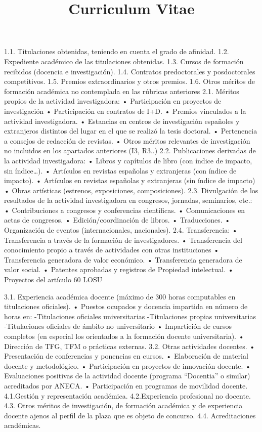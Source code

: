 \documentclass[a4paper,skipsamekey,11pt,english]{curve}
\title{Curriculum Vitae}
\begin{document}
 \makeheaders[c]

1.1. Titulaciones obtenidas, teniendo en cuenta el grado de afinidad.
1.2. Expediente académico de las titulaciones obtenidas.
1.3. Cursos de formación recibidos (docencia e investigación).
1.4. Contratos predoctorales y posdoctorales competitivos.
1.5. Premios extraordinarios y otros premios.
1.6. Otros méritos de formación académica no contemplada en las rúbricas anteriores
2.1. Méritos propios de la actividad investigadora:
• Participación en proyectos de investigación
• Participación en contratos de I+D.
• Premios vinculados a la actividad investigadora.
• Estancias en centros de investigación españoles y extranjeros distintos del lugar en el que
se realizó la tesis doctoral.
• Pertenencia a consejos de redacción de revistas.
• Otros méritos relevantes de investigación no incluidos en los apartados anteriores (I3, R3..)
2.2. Publicaciones derivadas de la actividad investigadora:
• Libros y capítulos de libro (con índice de impacto, sin índice…).
• Artículos en revistas españolas y extranjeras (con índice de impacto).
• Artículos en revistas españolas y extranjeras (sin índice de impacto)
• Obras artísticas (estrenos, exposiciones, composiciones).
2.3. Divulgación de los resultados de la actividad investigadora en congresos, jornadas,
seminarios, etc.:
• Contribuciones a congresos y conferencias científicas.
• Comunicaciones en actas de congresos.
• Edición/coordinación de libros.
• Traducciones.
• Organización de eventos (internacionales, nacionales).
2.4. Transferencia:
• Transferencia a través de la formación de investigadores.
• Transferencia del conocimiento propio a través de actividades con otras instituciones
• Transferencia generadora de valor económico.
• Transferencia generadora de valor social.
• Patentes aprobadas y registros de Propiedad intelectual.
• Proyectos del artículo 60 LOSU

3.1. Experiencia académica docente (máximo de 300 horas computables en titulaciones
oficiales).
• Puestos ocupados y docencia impartida en número de horas en:
-Titulaciones oficiales universitarias
-Titulaciones propias universitarias
-Titulaciones oficiales de ámbito no universitario
• Impartición de cursos completos (en especial los orientados a la formación docente
universitaria).
• Dirección de TFG, TFM o prácticas externas.
3.2. Otras actividades docentes.
• Presentación de conferencias y ponencias en cursos.
• Elaboración de material docente y metodológico.
• Participación en proyectos de innovación docente.
• Evaluaciones positivas de la actividad docente (programa “Docentia” o similar) acreditados
por ANECA.
• Participación en programas de movilidad docente.
4.1.Gestión y representación académica. 4.2.Experiencia profesional no docente.
4.3. Otros méritos de investigación, de formación académica y de experiencia docente ajenos al
perfil de la plaza que es objeto de concurso.
4.4. Acreditaciones académicas.
\end{document}
